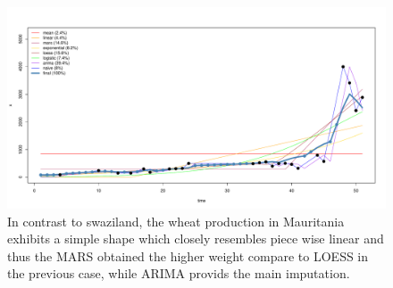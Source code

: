 \documentclass[nojss]{jss}\usepackage[]{graphicx}\usepackage[]{color}
\makeatletter
\def\maxwidth{ %
  \ifdim\Gin@nat@width>\linewidth
    \linewidth
  \else
    \Gin@nat@width
  \fi
}
\newenvironment{knitrout}{}{} %
\makeatother
\begin{document}
\begin{knitrout}
\color{fgcolor}\begin{figure}[!ht]


{\centering \includegraphics[width=\maxwidth]{figure/wheat-mauritania} 

}

\caption[In contrast to swaziland, the wheat production in Mauritania exhibits a simple shape which closely resembles piece wise linear and thus the MARS obtained the higher weight compare to LOESS in the previous case, while ARIMA provids the main imputation]{In contrast to swaziland, the wheat production in Mauritania exhibits a simple shape which closely resembles piece wise linear and thus the MARS obtained the higher weight compare to LOESS in the previous case, while ARIMA provids the main imputation.\label{fig:wheat-mauritania}}
\end{figure}


\end{knitrout}
\end{document}
